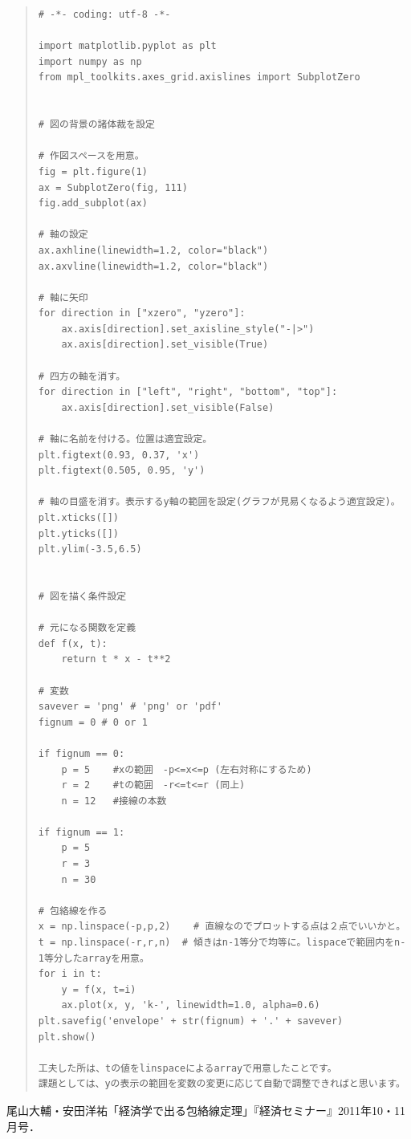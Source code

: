 \documentclass[11pt,a4j,fleqn]{jarticle}
\begin{document}
\begin{quote}
\begin{verbatim}
# -*- coding: utf-8 -*-

import matplotlib.pyplot as plt
import numpy as np
from mpl_toolkits.axes_grid.axislines import SubplotZero


# 図の背景の諸体裁を設定

# 作図スペースを用意。	
fig = plt.figure(1)
ax = SubplotZero(fig, 111)
fig.add_subplot(ax)

# 軸の設定
ax.axhline(linewidth=1.2, color="black")
ax.axvline(linewidth=1.2, color="black")

# 軸に矢印
for direction in ["xzero", "yzero"]:
	ax.axis[direction].set_axisline_style("-|>")
	ax.axis[direction].set_visible(True)

# 四方の軸を消す。	
for direction in ["left", "right", "bottom", "top"]:
	ax.axis[direction].set_visible(False)

# 軸に名前を付ける。位置は適宜設定。	
plt.figtext(0.93, 0.37, 'x')  
plt.figtext(0.505, 0.95, 'y')

# 軸の目盛を消す。表示するy軸の範囲を設定(グラフが見易くなるよう適宜設定)。
plt.xticks([])
plt.yticks([])		
plt.ylim(-3.5,6.5)


# 図を描く条件設定

# 元になる関数を定義
def f(x, t):
    return t * x - t**2

# 変数
savever = 'png' # 'png' or 'pdf'
fignum = 0 # 0 or 1

if fignum == 0:  
    p = 5    #xの範囲　-p<=x<=p (左右対称にするため)
    r = 2    #tの範囲　-r<=t<=r (同上)
    n = 12   #接線の本数

if fignum == 1:
    p = 5
    r = 3
    n = 30
	
# 包絡線を作る
x = np.linspace(-p,p,2)    # 直線なのでプロットする点は２点でいいかと。
t = np.linspace(-r,r,n)  # 傾きはn-1等分で均等に。lispaceで範囲内をn-1等分したarrayを用意。
for i in t:
	y = f(x, t=i)
	ax.plot(x, y, 'k-', linewidth=1.0, alpha=0.6)
plt.savefig('envelope' + str(fignum) + '.' + savever)
plt.show()

工夫した所は、tの値をlinspaceによるarrayで用意したことです。
課題としては、yの表示の範囲を変数の変更に応じて自動で調整できればと思います。

\end{verbatim}
\end{quote}


\begin{thebibliography}{0}
尾山大輔・安田洋祐「経済学で出る包絡線定理」『経済セミナー』2011年10・11月号．
\end{thebibliography}
\end{document}
